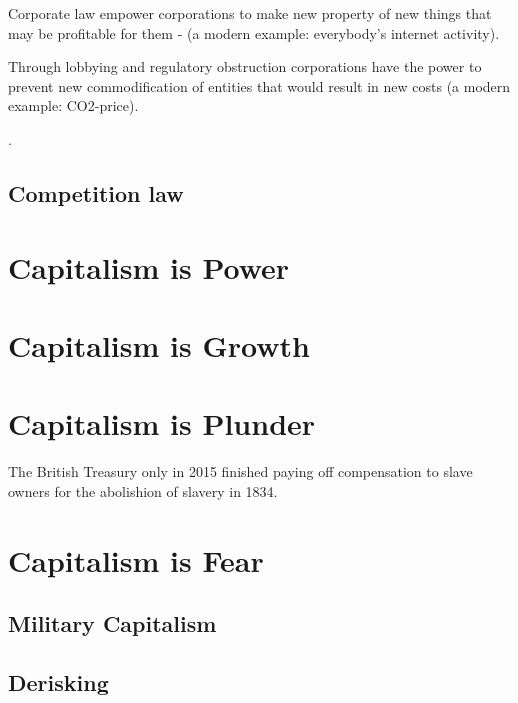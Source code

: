 \documentclass[
]{book}
\begin{document}
Corporate law empower corporations to make new property of new things that may be profitable for them -
(a modern example: everybody's internet activity).

Through lobbying and regulatory obstruction corporations have the power to prevent
new commodification of entities that would result in new costs (a modern example: CO2-price).

.

\hypertarget{competition-law}{%
\section{Competition law}\label{competition-law}}

\hypertarget{capitalism-is-power}{%
\chapter{Capitalism is Power}\label{capitalism-is-power}}

\hypertarget{capitalism-is-growth}{%
\chapter{Capitalism is Growth}\label{capitalism-is-growth}}

\hypertarget{capitalism-is-plunder}{%
\chapter{Capitalism is Plunder}\label{capitalism-is-plunder}}

The British Treasury only in 2015 finished paying off compensation
to slave owners for the abolishion of slavery in 1834.

\hypertarget{capitalism-is-fear}{%
\chapter{Capitalism is Fear}\label{capitalism-is-fear}}

\hypertarget{military-capitalism}{%
\section{Military Capitalism}\label{military-capitalism}}

\hypertarget{derisking}{%
\section{Derisking}\label{derisking}}
\end{document}
